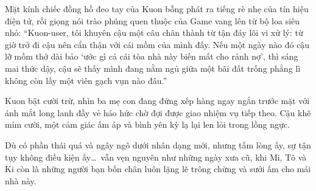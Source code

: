 \documentclass[../main.tex]{subfiles}
\begin{document}
Mặt kính chiếc đồng hồ đeo tay của Kuon bỗng phát ra tiếng rè nhẹ của tín hiệu điện tử, rồi giọng nói trào phúng quen thuộc của Game vang lên từ bộ loa siêu nhỏ: ``Kuon-user, tôi khuyên cậu một câu chân thành từ tận đáy lõi vi xử lý: từ giờ trở đi cậu nên cẩn thận với cái mồm của mình đấy. Nếu một ngày nào đó cậu lỡ mồm thở dài bảo `ước gì cả cái tòa nhà này biến mất cho rảnh nợ', thì sáng mai thức dậy, cậu sẽ thấy mình đang nằm ngủ giữa một bãi đất trống phẳng lì không còn lấy một viên gạch vụn nào đâu.''

Kuon bật cười trừ, nhìn ba mẹ con đang đứng xếp hàng ngay ngắn trước mặt với ánh mắt long lanh đầy vẻ háo hức chờ đợi được giao nhiệm vụ tiếp theo. Cậu khẽ mỉm cười, một cảm giác ấm áp và bình yên kỳ lạ lại len lỏi trong lồng ngực.

Dù có phần thái quá và ngây ngô dưới nhân dạng mới, nhưng tấm lòng ấy, sự tận tụy không điều kiện ấy\dots\ vẫn vẹn nguyên như những ngày xưa cũ, khi Mi, Tô và Ki còn là những người bạn bốn chân luôn lặng lẽ trông chừng và sưởi ấm cho mái nhà này.
\end{document}
